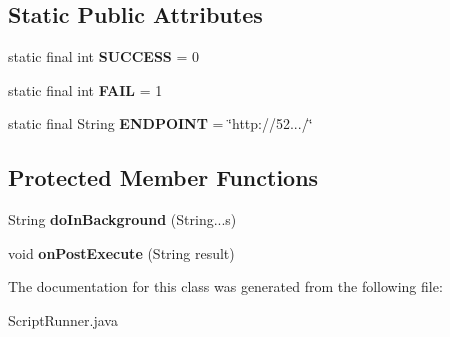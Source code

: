 \subsection*{\-Static \-Public \-Attributes}
\begin{DoxyCompactItemize}
\item 
\hypertarget{classcom_1_1example_1_1sel_1_1lostfound_1_1ScriptRunner_af663271a5e699ad47264102b5445799e}{static final int {\bfseries \-S\-U\-C\-C\-E\-S\-S} = 0}\label{classcom_1_1example_1_1sel_1_1lostfound_1_1ScriptRunner_af663271a5e699ad47264102b5445799e}

\item 
\hypertarget{classcom_1_1example_1_1sel_1_1lostfound_1_1ScriptRunner_af872e324d4d349db617f9511009901a9}{static final int {\bfseries \-F\-A\-I\-L} = 1}\label{classcom_1_1example_1_1sel_1_1lostfound_1_1ScriptRunner_af872e324d4d349db617f9511009901a9}

\item 
\hypertarget{classcom_1_1example_1_1sel_1_1lostfound_1_1ScriptRunner_a6b8f5d1e77298c2f260fd7ef9502650d}{static final \-String {\bfseries \-E\-N\-D\-P\-O\-I\-N\-T} = \char`\"{}http\-://52.../\char`\"{}}\label{classcom_1_1example_1_1sel_1_1lostfound_1_1ScriptRunner_a6b8f5d1e77298c2f260fd7ef9502650d}

\end{DoxyCompactItemize}
\subsection*{\-Protected \-Member \-Functions}
\begin{DoxyCompactItemize}
\item 
\hypertarget{classcom_1_1example_1_1sel_1_1lostfound_1_1ScriptRunner_a9050c944957b5b8fcacc9d2cba6f3b71}{\-String {\bfseries do\-In\-Background} (\-String...\-s)}\label{classcom_1_1example_1_1sel_1_1lostfound_1_1ScriptRunner_a9050c944957b5b8fcacc9d2cba6f3b71}

\item 
\hypertarget{classcom_1_1example_1_1sel_1_1lostfound_1_1ScriptRunner_affce5629df2ecd60a45f3c707b996955}{void {\bfseries on\-Post\-Execute} (\-String result)}\label{classcom_1_1example_1_1sel_1_1lostfound_1_1ScriptRunner_affce5629df2ecd60a45f3c707b996955}

\end{DoxyCompactItemize}


\-The documentation for this class was generated from the following file\-:\begin{DoxyCompactItemize}
\item 
\-Script\-Runner.\-java\end{DoxyCompactItemize}
